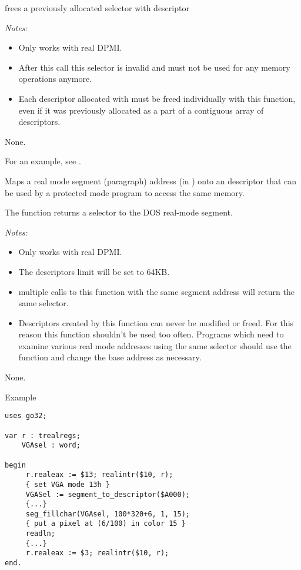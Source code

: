 {
 frees a previously allocated selector
with descriptor 

{\em Notes:}
\begin{itemize}
\item Only works with real DPMI.
\item After this call this selector is invalid and must not be used for any
memory operations anymore.
\item Each descriptor allocated with  must be 
freed
individually with this function, even if it was previously allocated as
a part of a contiguous array of descriptors.
\end{itemize}
}
{None.}
{}

For an example, see .

{ Maps a real mode segment (paragraph) address 
(in ) onto an descriptor that can be used by a protected mode 
program to access  the same memory.

The function returns a selector to the DOS real-mode segment.

{\em Notes:}
\begin{itemize}
\item Only works with real DPMI.
\item The descriptors limit will be set to 64KB.
\item multiple calls to this function with the same segment address will
  return the same selector.
\item Descriptors created by this function can never be modified or freed.
For this reason this function shouldn't be used too often. Programs
which need to examine various real mode addresses using the same
selector should use the function  and change
the base address as necessary.
\end{itemize}
}
{None.}
{}
\begin{FPKList}
\item[Example]
\begin{verbatim}
uses go32;

var r : trealregs;
    VGAsel : word;

begin
     r.realeax := $13; realintr($10, r); 
     { set VGA mode 13h }
     VGASel := segment_to_descriptor($A000);
     {...}
     seg_fillchar(VGAsel, 100*320+6, 1, 15); 
     { put a pixel at (6/100) in color 15 }
     readln;
     {...} 
     r.realeax := $3; realintr($10, r);
end.
\end{verbatim}
\end{FPKList}



